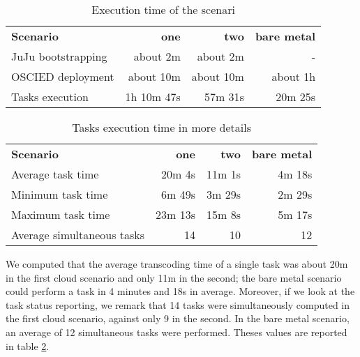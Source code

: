 \documentclass[a4paper, titlepage]{paper}
\numberwithin{figure}{section}
\numberwithin{table}{section}
\begin{document}
      \begin{table}
        \centering
        \begin{tabular}{lrrr}
          \textbf{Scenario}   & \textbf{one}  & \textbf{two}  & \textbf{bare metal} \\
          JuJu bootstrapping  & about 2m      & about 2m      & -        \\
          OSCIED deployment   & about 10m     & about 10m     & about 1h \\
          Tasks execution     & 1h 10m 47s    & 57m 31s       & 20m 25s
        \end{tabular}
        \caption{Execution time of the scenari}
        \label{table:scenari-overall-times}
      \end{table}

      \begin{table}
        \centering
        \begin{tabular}{lrrr}
          \textbf{Scenario}           & \textbf{one}  & \textbf{two}  & \textbf{bare metal} \\
          Average task time           & 20m 4s        & 11m 1s        & 4m 18s \\
          Minimum task time           & 6m 49s        & 3m 29s        & 2m 29s \\
          Maximum task time           & 23m 13s       & 15m 8s        & 5m 17s \\
          Average simultaneous tasks  & 14            & 10            & 12
        \end{tabular}
        \caption{Tasks execution time in more details}
        \label{table:scenari-times}
      \end{table}

      We computed that the average transcoding time of a single task was about 20m in the first cloud scenario and only 11m in the second; the bare metal scenario could perform a task in 4 minutes and 18s in average. Moreover, if we look at the task status reporting, we remark that 14 tasks were simultaneously computed in the first cloud scenario, against only 9 in the second. In the bare metal scenario, an average of 12 simultaneous tasks were performed. Theses values are reported in table \ref{table:scenari-times}.
\end{document}

